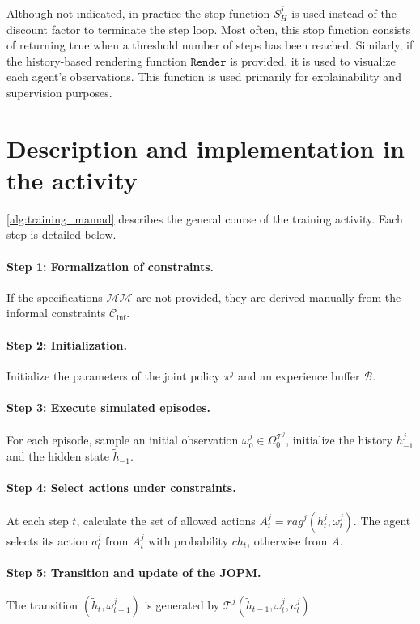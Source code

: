 Although not indicated, in practice the stop function $S^j_H$ is used instead of the discount factor to terminate the step loop. Most often, this stop function consists of returning true when a threshold number of steps has been reached.
%
Similarly, if the history-based rendering function $\texttt{Render}$ is provided, it is used to visualize each agent's observations. This function is used primarily for explainability and supervision purposes.


\section{Description and implementation in the activity}

\autoref{alg:training_mamad} describes the general course of the training activity.
Each step is detailed below.

\paragraph{Step 1: Formalization of constraints.}
If the specifications $\mathcal{MM}$ are not provided, they are derived manually from the informal constraints $\mathcal{C}_{\text{inf}}$.

\paragraph{Step 2: Initialization.}
Initialize the parameters of the joint policy $\pi^j$ and an experience buffer $\mathcal{B}$.

\paragraph {Step 3: Execute simulated episodes.}
For each episode, sample an initial observation $\omega_0^j \in \Omega^{\mathcal{T}^j}_0$, initialize the history $h_{-1}^j$ and the hidden state $\tilde{h}_{-1}$.

\paragraph{Step 4: Select actions under constraints.}
At each step $t$, calculate the set of allowed actions $A_t^j = rag^j(h^j_t,\omega_t^j)$.
The agent selects its action $a_t^j$ from $A_t^j$ with probability $ch_t$, otherwise from $A$.

\paragraph{Step 5: Transition and update of the JOPM.}
The transition $(\tilde{h}_t,\omega_{t+1}^j)$ is generated by $\mathcal{T}^j(\tilde{h}_{t-1},\omega_t^j,a_t^j)$.

